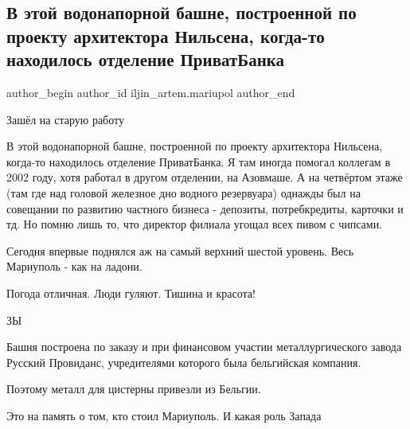  
 
 
 
 

\subsection{В этой водонапорной башне, построенной по проекту архитектора Нильсена, когда-то находилось отделение ПриватБанка}
\label{sec:19_02_2022.fb.iljin_artem.mariupol.1.v_etoi_vodonapornoi_}

\ifcmt
 author_begin
   author_id iljin_artem.mariupol
 author_end
\fi

Зашёл на старую работу 🙂 

В этой водонапорной башне, построенной по проекту архитектора Нильсена,
когда-то находилось отделение ПриватБанка. Я там иногда помогал коллегам в 2002
году, хотя работал в другом отделении, на Азовмаше. А на четвёртом этаже (там
где над головой железное дно водного резервуара) однажды был на совещании по
развитию частного бизнеса - депозиты, потребкредиты, карточки и тд. Но помню
лишь то, что директор филиала угощал всех пивом с чипсами.

Сегодня впервые поднялся аж на самый верхний шестой уровень. Весь Мариуполь -
как на ладони.

Погода отличная. Люди гуляют. Тишина и красота!

ЗЫ

Башня построена по заказу и при финансовом участии металлургического завода
Русский Провиданс, учредителями которого была бельгийская компания.

Поэтому металл для цистерны привезли из Бельгии.

Это на память о том, кто стоил Мариуполь. И какая роль Запада

